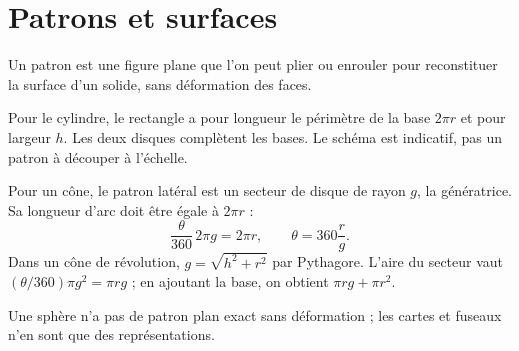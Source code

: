 \documentclass[../cours_3e.tex]{subfiles}
\begin{document}
\section{Patrons et surfaces}
\begin{definition}
Un patron est une figure plane que l'on peut plier ou enrouler pour reconstituer la surface d'un solide, sans déformation des faces.
\end{definition}
\begin{center}
\end{center}
Pour le cylindre, le rectangle a pour longueur le périmètre de la base $2\pi r$ et pour largeur $h$. Les deux disques complètent les bases. Le schéma est indicatif, pas un patron à découper à l'échelle.

Pour un cône, le patron latéral est un secteur de disque de rayon $g$, la génératrice. Sa longueur d'arc doit être égale à $2\pi r$ :
\[\frac{\theta}{360}\,2\pi g=2\pi r,\qquad
\theta=360\frac rg.\]
Dans un cône de révolution, $g=\sqrt{h^2+r^2}$ par Pythagore. L'aire du secteur vaut $(\theta/360)\pi g^2=\pi rg$ ; en ajoutant la base, on obtient $\pi rg+\pi r^2$.

\approfondissement Une sphère n'a pas de patron plan exact sans déformation ; les cartes et fuseaux n'en sont que des représentations.
\end{document}
